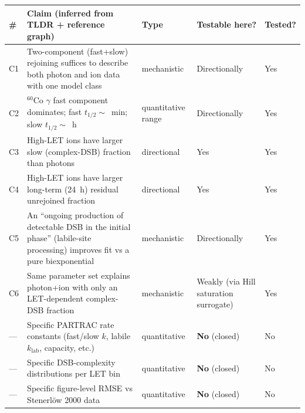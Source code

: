 \documentclass[11pt]{article}
\begin{document}
\begin{longtable}{@{}p{0.4cm}p{7.5cm}p{2cm}p{2cm}p{2cm}@{}}
\toprule
\# & Claim (inferred from TLDR + reference graph) & Type & Testable here? & Tested? \\
\midrule
\endhead
C1 & Two-component (fast+slow) rejoining suffices to describe both photon and ion data with one model class & mechanistic & Directionally & Yes \\
C2 & $^{60}$Co $\gamma$ fast component dominates; fast $t_{1/2}\sim$~min; slow $t_{1/2}\sim$~h & quantitative range & Directionally & Yes \\
C3 & High-LET ions have larger slow (complex-DSB) fraction than photons & directional & Yes & Yes \\
C4 & High-LET ions have larger long-term (24~h) residual unrejoined fraction & directional & Yes & Yes \\
C5 & An ``ongoing production of detectable DSB in the initial phase'' (labile-site processing) improves fit vs a pure biexponential & mechanistic & Directionally & Yes \\
C6 & Same parameter set explains photon+ion with only an LET-dependent complex-DSB fraction & mechanistic & Weakly (via Hill saturation surrogate) & Yes \\
--- & Specific PARTRAC rate constants (fast/slow $k$, labile $k_{\text{lab}}$, capacity, etc.) & quantitative & \textbf{No} (closed) & No \\
--- & Specific DSB-complexity distributions per LET bin & quantitative & \textbf{No} (closed) & No \\
--- & Specific figure-level RMSE vs Stenerl\"ow 2000 data & quantitative & \textbf{No} (closed) & No \\
\bottomrule
\end{longtable}
\end{document}
